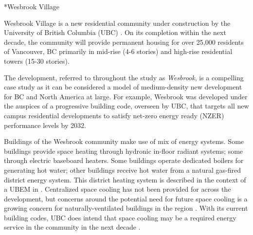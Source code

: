 \documentclass[twocolumn, a4paper,10pt]{article}
\makeatletter
\renewcommand\subsection{\@startsection{subsection}{1}{\z@}{\z@}{\z@}{\normalfont\normalsize\bfseries}}
\renewcommand\subsection{\@startsection{subsection}{1}{\z@}{\z@}{0.1pt}{\normalfont\normalsize\bfseries}}
\makeatother
\begin{document}


\subsection*{Wesbrook Village} 

Wesbrook Village is a new residential community under construction by the University of British Columbia (UBC) \citep{ubc_planning_ubc_2020_SR, ubc_planning_ubc_2020_wb}. On its completion within the next decade, the community will provide permanent housing for over 25,000 residents of Vancouver, BC primarily in mid-rise (4-6 stories) and high-rise residential towers (15-30 stories). 

The development, referred to throughout the study as \textit{Wesbrook}, is a compelling case study as it can be considered a model of medium-density new development for BC and North America at large. For example, Wesbrook was developed under the auspices of a progressive building code, overseen by UBC, that targets all new campus residential developments to satisfy net-zero energy ready (NZER) performance levels by 2032.

Buildings of the Wesbrook community make use of mix of energy systems. Some buildings provide space heating through hydronic in-floor radiant systems; some through electric baseboard heaters. Some buildings operate dedicated boilers for generating hot water; other buildings receive hot water from a natural gas-fired district energy system. This district heating system is described in the context of a UBEM in \citet{mccarty_accepted_2020}. Centralized space cooling has not been provided for across the development, but concerns around the potential need for future space cooling is a growing concern for naturally-ventilated buildings in the region \citep{rysanek_forecasting_2021}. With its current building codes, UBC does intend that space cooling may be a required energy service in the community in the next decade \citep{noauthor_residential_2021}.
\end{document}
